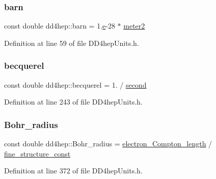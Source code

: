 \hypertarget{namespacedd4hep_a561a205dfb5e2f3151e032ad640f1d35}{}\label{namespacedd4hep_a561a205dfb5e2f3151e032ad640f1d35} 
\subsubsection{\texorpdfstring{barn}{barn}}
{\footnotesize\ttfamily const double dd4hep\+::barn = 1.\hyperlink{_volumes_8cpp_a8a9a1f93e9b09afccaec215310e64142}{e}-\/28 $\ast$ \hyperlink{namespacedd4hep_afe718b0d811af6b4d45c556e3a0e87a3}{meter2}\hspace{0.3cm}{\ttfamily [static]}}



Definition at line 59 of file D\+D4hep\+Units.\+h.

\hypertarget{namespacedd4hep_a3c71f55bed97c3b05c92c0b81b3bb17e}{}\label{namespacedd4hep_a3c71f55bed97c3b05c92c0b81b3bb17e} 
\subsubsection{\texorpdfstring{becquerel}{becquerel}}
{\footnotesize\ttfamily const double dd4hep\+::becquerel = 1. / \hyperlink{namespacedd4hep_ac03364576705a245265d8ed6ea26b871}{second}\hspace{0.3cm}{\ttfamily [static]}}



Definition at line 243 of file D\+D4hep\+Units.\+h.

\hypertarget{namespacedd4hep_a8ac45765a3f92b051e7536784ce5f6d3}{}\label{namespacedd4hep_a8ac45765a3f92b051e7536784ce5f6d3} 
\subsubsection{\texorpdfstring{Bohr\+\_\+radius}{Bohr\_radius}}
{\footnotesize\ttfamily const double dd4hep\+::\+Bohr\+\_\+radius = \hyperlink{namespacedd4hep_ae9b92fa47cc9555cea0d6fa97a9036a3}{electron\+\_\+\+Compton\+\_\+length} / \hyperlink{namespacedd4hep_aa979b30c6c7f9ba61132327d4584bfde}{fine\+\_\+structure\+\_\+const}\hspace{0.3cm}{\ttfamily [static]}}



Definition at line 372 of file D\+D4hep\+Units.\+h.

